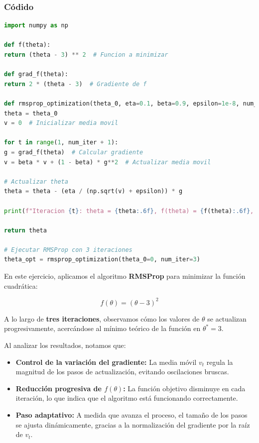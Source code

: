 \documentclass{article}
\begin{document}
\subsubsection*{Códido}
\begin{lstlisting}[language=Python, caption=Roor Mean Square Propagation, frame=single]
import numpy as np

def f(theta):
return (theta - 3) ** 2  # Funcion a minimizar

def grad_f(theta):
return 2 * (theta - 3)  # Gradiente de f

def rmsprop_optimization(theta_0, eta=0.1, beta=0.9, epsilon=1e-8, num_iter=3):
theta = theta_0
v = 0  # Inicializar media movil

for t in range(1, num_iter + 1):
g = grad_f(theta)  # Calcular gradiente
v = beta * v + (1 - beta) * g**2  # Actualizar media movil

# Actualizar theta
theta = theta - (eta / (np.sqrt(v) + epsilon)) * g

print(f"Iteracion {t}: theta = {theta:.6f}, f(theta) = {f(theta):.6f}, v = {v:.6f}")

return theta

# Ejecutar RMSProp con 3 iteraciones
theta_opt = rmsprop_optimization(theta_0=0, num_iter=3)

\end{lstlisting}

En este ejercicio, aplicamos el algoritmo \textbf{RMSProp} para minimizar la función cuadrática:

\[
f(\theta) = (\theta - 3)^2
\]

A lo largo de \textbf{tres iteraciones}, observamos cómo los valores de \( \theta \) se actualizan progresivamente, acercándose al mínimo teórico de la función en \( \theta^* = 3 \).

Al analizar los resultados, notamos que:

\begin{itemize}
	\item \textbf{Control de la variación del gradiente:} La media móvil \( v_t \) regula la magnitud de los pasos de actualización, evitando oscilaciones bruscas.
	\item \textbf{Reducción progresiva de \( f(\theta) \):} La función objetivo disminuye en cada iteración, lo que indica que el algoritmo está funcionando correctamente.
	\item \textbf{Paso adaptativo:} A medida que avanza el proceso, el tamaño de los pasos se ajusta dinámicamente, gracias a la normalización del gradiente por la raíz de \( v_t \).
\end{itemize}
\end{document}
